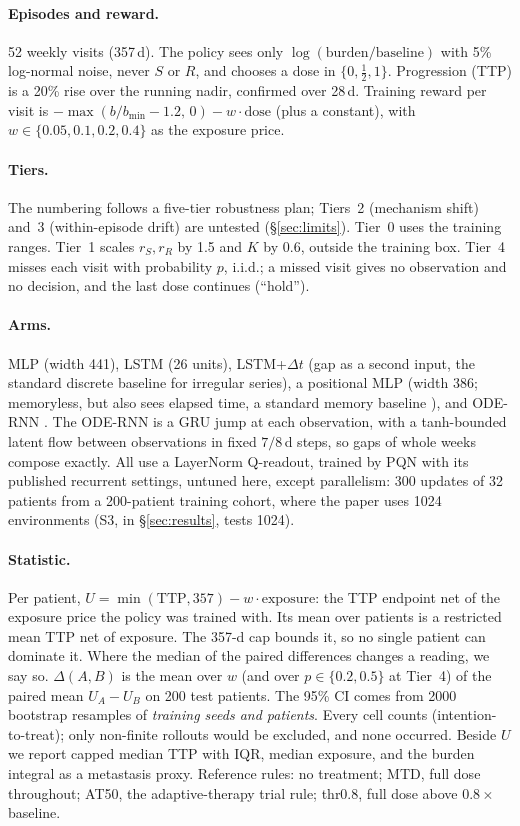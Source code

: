 \documentclass[10pt]{article}
\renewcommand{\cite}{\citep}
\begin{document}
\paragraph{Episodes and reward.} 52 weekly visits (357\,d). The policy sees
only $\log(\text{burden}/\text{baseline})$ with 5\% log-normal noise, never $S$
or $R$, and chooses a dose in $\{0, \tfrac12, 1\}$. Progression (TTP) is a 20\%
rise over the running nadir, confirmed over 28\,d. Training reward per visit is
$-\max(b/b_{\min}-1.2,\,0) - w\cdot\text{dose}$ (plus a constant), with
$w\in\{0.05,0.1,0.2,0.4\}$ as the exposure price.
\paragraph{Tiers.} The numbering follows a five-tier robustness plan; Tiers~2
(mechanism shift) and~3 (within-episode drift) are untested
(\S\ref{sec:limits}). Tier~0 uses the training ranges. Tier~1 scales $r_S, r_R$
by 1.5 and $K$ by 0.6, outside the training box. Tier~4 misses each visit with
probability $p$, i.i.d.; a missed visit gives no observation and no decision,
and the last dose continues (``hold'').
\paragraph{Arms.} MLP (width 441), LSTM (26 units), LSTM+$\Delta t$ (gap as a
second input, the standard discrete baseline for irregular series), a
positional MLP (width 386; memoryless, but also sees elapsed time, a standard
memory baseline \cite{morad2023}), and ODE-RNN
\cite{rubanova2019}. The ODE-RNN is a GRU jump at each observation, with a
tanh-bounded latent flow between observations in fixed $7/8$\,d steps, so gaps
of whole weeks compose exactly. All use a LayerNorm Q-readout, trained by PQN
\cite{gallici2024} with its published recurrent settings, untuned here, except
parallelism: 300 updates of 32 patients from a 200-patient training cohort,
where the paper uses 1024 environments (S3, in \S\ref{sec:results}, tests 1024).
\paragraph{Statistic.} Per patient, $U=\min(\mathrm{TTP},357)-w\cdot\text{exposure}$:
the TTP endpoint net of the exposure price the policy was trained with. Its
mean over patients is a restricted mean TTP net of exposure. The 357-d cap
bounds it, so no single patient can dominate it. Where the median of the paired
differences changes a reading, we say so.
$\Delta(A,B)$ is the mean over $w$ (and over $p\in\{0.2,0.5\}$ at Tier~4) of
the paired mean $U_A-U_B$ on 200 test patients. The 95\% CI comes from 2000
bootstrap resamples of \emph{training seeds and patients}. Every cell counts
(intention-to-treat); only non-finite rollouts would be excluded, and none
occurred. Beside $U$ we report capped median TTP with IQR, median exposure,
and the burden integral as a metastasis proxy. Reference rules: no treatment;
MTD, full dose throughout; AT50, the adaptive-therapy trial rule; thr0.8, full
dose above $0.8\times$ baseline.
\end{document}
